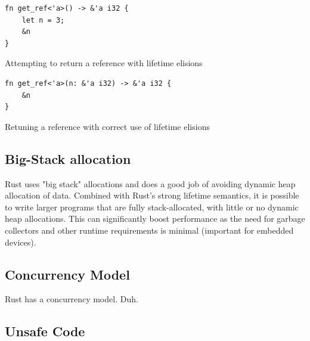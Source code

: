 \begin{listing}[tb]
\begin{verbatim}
fn get_ref<'a>() -> &'a i32 {
    let n = 3;
    &n
}
\end{verbatim}
\caption{Attempting to return a reference with lifetime elisions}
\label{lst:invalid_ref_lifetimes_rust}
\end{listing}

\begin{listing}[tb]
\begin{verbatim}
fn get_ref<'a>(n: &'a i32) -> &'a i32 {
    &n
}
\end{verbatim}
\caption{Retuning a reference with correct use of lifetime elisions}
\label{lst:valid_ref_rust}
\end{listing}


\subsection{Big-Stack allocation}
\label{par:big_stack}

Rust uses "big stack" allocations and does a good job of avoiding dynamic heap allocation of data.
Combined with Rust's strong lifetime semantics, it is possible to write larger programs that are fully stack-allocated, with little or no dynamic heap allocations.
This can significantly boost performance as the need for garbage collectors and other runtime requirements is minimal (important for embedded devices).



\subsection{Concurrency Model} %
\label{ssub:concurrency_model}

Rust has a concurrency model. Duh.


\subsection{Unsafe Code} %
\label{ssub:unsafe_code}

